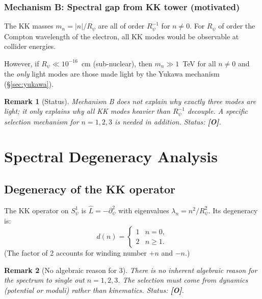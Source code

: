 \documentclass[11pt,a4paper]{article}
\newtheorem{remark}{Remark}
\begin{document}
\subsubsection{Mechanism B: Spectral gap from KK tower (motivated)}

The KK masses $m_n = |n|/R_\psi$ are all of order $R_\psi^{-1}$ for
$n \neq 0$.  For $R_\psi$ of order the Compton wavelength of the electron,
all KK modes would be observable at collider energies.

However, if $R_\psi \ll 10^{-16}$~cm (sub-nuclear), then
$m_n \gg 1$~TeV for all $n \neq 0$ and the \emph{only} light
modes are those made light by the Yukawa mechanism (§\ref{sec:yukawa}).

\begin{remark}[Status]
  Mechanism B does not explain why \emph{exactly three} modes are light;
  it only explains why all KK modes heavier than $R_\psi^{-1}$ decouple.
  A specific selection mechanism for $n = 1, 2, 3$ is needed in addition.
  Status: \textbf{[O]}.
\end{remark}

\section{Spectral Degeneracy Analysis}
\label{sec:degeneracy}

\subsection{Degeneracy of the KK operator}

The KK operator on $S^1_\psi$ is $\hat{L} = -\partial_\psi^2$ with
eigenvalues $\lambda_n = n^2/R_\psi^2$.  Its degeneracy is:
\begin{equation}
  d(n) = \begin{cases} 1 & n = 0, \\ 2 & n \geq 1. \end{cases}
\end{equation}
(The factor of 2 accounts for winding number $+n$ and $-n$.)

\begin{remark}[No algebraic reason for 3]
  There is no inherent algebraic reason for the spectrum to single out
  $n = 1, 2, 3$.  The selection must come from dynamics (potential or
  moduli) rather than kinematics.  Status: \textbf{[O]}.
\end{remark}
\end{document}
